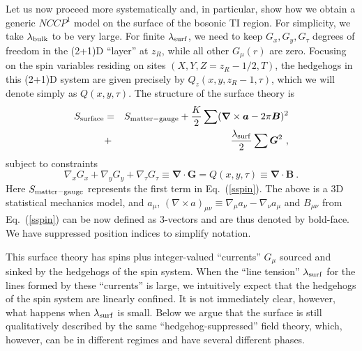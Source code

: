 \documentclass[prb,twocolumn]{revtex4-1}
\begin{document}
Let us now proceed more systematically and, in particular, show how we obtain a generic $NCCP^1$ model on the surface of the bosonic TI region.  For simplicity, we take $\lambda_{\rm bulk}$ to be very large. For finite $\lambda_{\rm surf}$, we need to keep $G_x, G_y, G_\tau$ degrees of freedom in the (2+1)D ``layer'' at $z_R$, while all other $G_\mu(r)$ are zero.  Focusing on the spin variables residing on sites $(X, Y, Z=z_R-1/2, T)$, the hedgehogs in this (2+1)D system are given precisely by $Q_z(x, y, z_R-1, \tau)$, which we will denote simply as $Q(x, y, \tau)$.  The structure of the surface theory is
\begin{eqnarray}
S_{\rm surface} &=& S_{\rm matter-gauge} + \frac{K}{2}\sum  ({\bm\nabla} \times {\bm a} - 2\pi {\bm B})^2\nonumber \\
&+& \frac{\lambda_{\rm surf}}{2}\sum  {\bm G}^2 ~,
\label{lesikeqn}
\end{eqnarray}
subject to constraints
\begin{equation}
 \nabla_x G_x + \nabla_y G_y + \nabla_\tau G_\tau \equiv {\bm \nabla} \cdot {\bm G} = Q(x,y,\tau) \equiv {\bm \nabla} \cdot {\bm B} ~.
\end{equation}
Here $S_{\rm matter-gauge}$ represents the first term in Eq.~(\ref{sspin}). The above is a 3D statistical mechanics model, and $a_\mu$, $(\nabla\times a)_{\mu\nu} \equiv \nabla_\mu a_\nu -\nabla_\nu a_\mu$ and $B_{\mu\nu}$ from Eq.~(\ref{sspin}) can be now defined as 3-vectors and are thus denoted by bold-face. We have suppressed position indices to simplify notation.

This surface theory has spins plus integer-valued ``currents'' $G_\mu$ sourced and sinked by the hedgehogs of the spin system.  When the ``line tension'' $\lambda_{\rm surf}$ for the lines formed by these ``currents'' is large, we intuitively expect that the hedgehogs of the spin system are linearly confined.  It is not immediately clear, however, what happens when $\lambda_{\rm surf}$ is small.  Below we argue that the surface is still qualitatively described by the same ``hedgehog-suppressed'' field theory, which, however, can be in different regimes and have several different phases.
\end{document}
